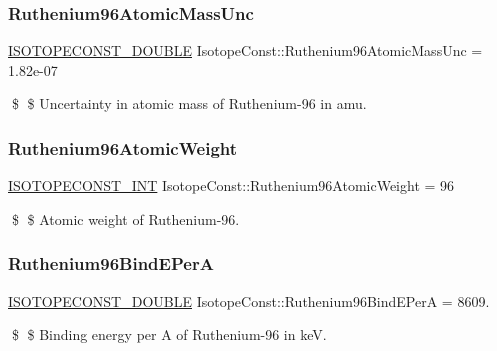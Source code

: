 \subsubsection{\texorpdfstring{Ruthenium96\+Atomic\+Mass\+Unc}{Ruthenium96AtomicMassUnc}}
{\footnotesize\ttfamily \mbox{\hyperlink{group___isotope_const-_macros_ga8f45a7272ce02c0b4c65c44636ed719a}{I\+S\+O\+T\+O\+P\+E\+C\+O\+N\+S\+T\+\_\+\+D\+O\+U\+B\+LE}} Isotope\+Const\+::\+Ruthenium96\+Atomic\+Mass\+Unc = 1.\+82e-\/07}

\$ \$ Uncertainty in atomic mass of Ruthenium-\/96 in amu. \mbox{\label{group___isotope_const-_ruthenium-_ru96_gafa74aa39836f7bcd86b5c99c530d13aa}} 
\subsubsection{\texorpdfstring{Ruthenium96\+Atomic\+Weight}{Ruthenium96AtomicWeight}}
{\footnotesize\ttfamily \mbox{\hyperlink{group___isotope_const-_macros_ga5f18360b3e99483a35c32d789e62621c}{I\+S\+O\+T\+O\+P\+E\+C\+O\+N\+S\+T\+\_\+\+I\+NT}} Isotope\+Const\+::\+Ruthenium96\+Atomic\+Weight = 96}

\$ \$ Atomic weight of Ruthenium-\/96. \mbox{\label{group___isotope_const-_ruthenium-_ru96_gaee7eb7ff60aff64c88b109464275b25e}} 
\subsubsection{\texorpdfstring{Ruthenium96\+Bind\+E\+PerA}{Ruthenium96BindEPerA}}
{\footnotesize\ttfamily \mbox{\hyperlink{group___isotope_const-_macros_ga8f45a7272ce02c0b4c65c44636ed719a}{I\+S\+O\+T\+O\+P\+E\+C\+O\+N\+S\+T\+\_\+\+D\+O\+U\+B\+LE}} Isotope\+Const\+::\+Ruthenium96\+Bind\+E\+PerA = 8609.}

\$ \$ Binding energy per A of Ruthenium-\/96 in keV. \mbox{\label{group___isotope_const-_ruthenium-_ru96_ga92a7f154d09285a2a06eb17c4c7b64d5}} 
